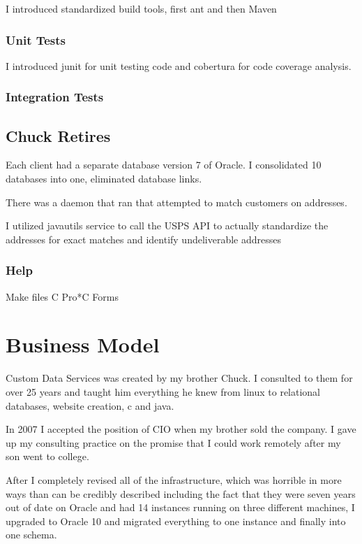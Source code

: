 \documentclass[letterpaper,10pt,english]{sphinxmanual}
\begin{document}
I introduced standardized build tools, first ant and then Maven


\subsubsection{Unit Tests}
\label{\detokenize{Contributions:unit-tests}}
I introduced junit for unit testing code and cobertura for code coverage analysis.


\subsubsection{Integration Tests}
\label{\detokenize{Contributions:integration-tests}}

\subsection{Chuck Retires}
\label{\detokenize{Contributions:chuck-retires}}
Each client had a separate database version 7 of Oracle.
I consolidated 10 databases into one, eliminated database links.

There was a daemon that ran that attempted to match customers on addresses.

I utilized javautils service to call the USPS API to actually standardize the
addresses for exact matches and identify undeliverable addresses


\subsubsection{Help}
\label{\detokenize{Contributions:help}}
Make files
C
Pro*C
Forms


\section{Business Model}
\label{\detokenize{Contributions:business-model}}
Custom Data Services was created by my brother Chuck.  I consulted to them for over 25 years and
taught him everything he knew from linux to relational databases, website creation, c and java.

In 2007 I accepted the position of CIO when my brother sold the company.  I gave up my consulting practice
on the promise that I could work remotely after my son went to college.

After I completely revised all of the infrastructure, which was horrible in more ways than can be credibly described
including the fact that they were seven years out of date on Oracle and had 14 instances running on three different
machines, I upgraded to Oracle 10 and migrated everything to one instance and finally into one schema.
\end{document}
